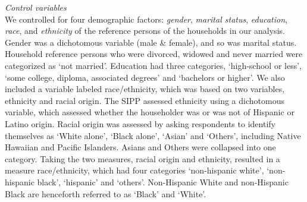 \documentclass[11pt]{extarticle} %
\begin{document}
\noindent
{\emph{Control variables}}\\
We controlled for four demographic factors: {\emph{gender}}, {\emph{marital status}}, {\emph{education}}, {\emph{race}}, and {\emph{ethnicity}} of the reference persons of the households in our analysis. Gender was a dichotomous variable (male \& female), and so was marital status. Household reference persons who were divorced, widowed and never married were categorized as `not
married'. Education had three categories, `high-school or less', `some college, diploma, associated degrees' and `bachelors or higher'. We also included a variable labeled race/ethnicity, which was
based on two variables, ethnicity and racial origin. The SIPP assessed ethnicity using a dichotomous variable, which assessed whether the householder was or was not of Hispanic or
Latino origin. Racial origin was assessed by asking respondents to identify themselves as `White alone', `Black alone', `Asian' and `Others', including Native Hawaiian and Pacific Islanders. Asians
and Others were collapsed into one category. Taking the two measures, racial origin and ethnicity, resulted in a measure race/ethnicity, which had four categories `non-hispanic white', `non-hispanic black', `hispanic' and `others'. Non-Hispanic White and non-Hispanic Black are henceforth referred to as `Black' and `White'. 
\end{document}
